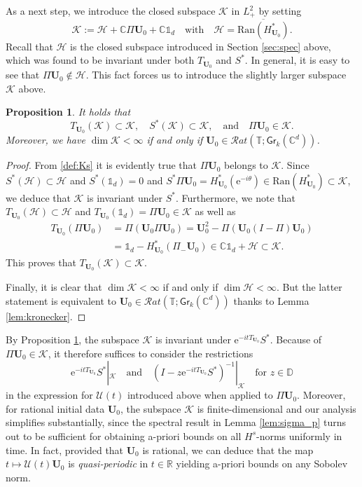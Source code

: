 \documentclass[10pt,reqno,a4paper]{amsart}
\newtheorem{prop}{Proposition}[section]
\theoremstyle{definition}
\theoremstyle{remark}
\theoremstyle{remark}
\numberwithin{equation}{section}
\newcommand{\C}{\mathbb{C}}
\newcommand{\R}{\mathbb{R}}
\newcommand{\T}{\mathbb{T}}
\newcommand{\D}{\mathbb{D}}
\newcommand{\ov}{\overline}
\newcommand{\ran}{\mathrm{Ran}}
\newcommand{\be}{\begin{equation}}
\newcommand{\ee}{\end{equation}}
\newcommand{\eu}{\mathrm{e}}
\newcommand{\Ub}{\mathbf{U}}
\newcommand{\id}{I}
\newcommand{\Gr}{\mathsf{Gr}}
\newcommand{\Ks}{\mathscr{K}}
\newcommand{\Hs}{\mathscr{H}}
\newcommand{\Us}{\mathscr{U}}
\begin{document}
As a next step, we introduce the closed subspace $\Ks$ in $L^2_+$ by setting
\be \label{def:Ks}
\Ks := \Hs + \C \Pi \Ub_0 + \C \mathds{1}_d \quad \mbox{with} \quad \Hs = \ov{\ran (H^*_{\Ub_0})}.
\ee
Recall that $\Hs$ is the closed subspace introduced in Section \ref{sec:spec} above, which was found to be invariant under both $T_{\Ub_0}$ and $S^*$.  In general,  it is easy to see that $\Pi \Ub_0 \not \in \Hs$. This fact  forces us to introduce the slightly larger subspace $\Ks$ above. 

\begin{prop} \label{prop:Ks}
It holds that 
$$T_{\Ub_0}(\Ks) \subset \Ks, \quad S^*(\Ks) \subset \Ks, \quad \mbox{and} \quad \Pi \Ub_0 \in \Ks.
$$ 
Moreover, we have $\dim \Ks < \infty$ if and only if $\Ub_0 \in \mathcal{R}at(\T; \Gr_k(\C^d))$.
\end{prop}

\begin{proof}
From \eqref{def:Ks} it is evidently true that $\Pi \Ub_0$ belongs to $\Ks$. Since $S^*(\Hs) \subset \Hs$ and $S^*(\mathds{1}_d) = 0$ and $S^* \Pi \Ub_0 = H^*_{\Ub_0}(\eu^{-i \theta}) \in \ran(H^*_{\Ub_0}) \subset \Ks$, we deduce that $\Ks$ is invariant under $S^*$. Furthermore, we note that $T_{\Ub_0}(\Hs) \subset \Hs$ and $T_{\Ub_0}(\mathds{1}_d) = \Pi \Ub_0 \in \Ks$ as well as
\begin{align*}
T_{\Ub_0}(\Pi \Ub_0) & = \Pi( \Ub_0 \Pi \Ub_0) = \Ub_0^2 - \Pi (\Ub_0( \id - \Pi) \Ub_0) \\
& = \mathds{1}_d - H^*_{\Ub_0}(\Pi_- \Ub_0) \in \C \mathds{1}_d + \Hs \subset \Ks.
\end{align*}
This proves that $T_{\Ub_0}(\Ks) \subset \Ks$. 

Finally, it is clear that $\dim \Ks < \infty$ if and only if $\dim \Hs < \infty$. But the latter statement is equivalent to $\Ub_0 \in \mathcal{R}at(\T; \Gr_k(\C^d))$ thanks to Lemma \ref{lem:kronecker}.
\end{proof}

By Proposition \ref{prop:Ks}, the subspace $\Ks$ is invariant under $\eu^{-it T_{\Ub_0}} S^*$. Because of $\Pi \Ub_0 \in \Ks$, it therefore suffices to consider the restrictions
$$
\eu^{-itT_{\Ub_0}} S^* |_{\Ks} \quad \mbox{and} \quad (\id - z \eu^{-it T_{\Ub_0}} S^*)^{-1} |_{\Ks} \quad \mbox{for $z \in \D$}
$$
in the expression for $\Us(t)$ introduced above when applied to $\Pi \Ub_0$. Moreover, for rational initial data $\Ub_0$, the subspace $\Ks$ is finite-dimensional and our analysis simplifies substantially, since the spectral result in Lemma \ref{lem:sigma_p} turns out to be sufficient for obtaining a-priori bounds on all $H^s$-norms uniformly in time. In fact, provided that $\Ub_0$ is rational, we can deduce that the map $t \mapsto \Us(t) \Ub_0$ is {\em quasi-periodic} in $t \in \R$ yielding a-priori bounds on any Sobolev norm. 
\end{document}
